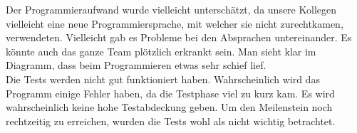 \documentclass[12pt,pdftex,a4paper]{article}
\begin{document}
\begin{itemize}
Der Programmieraufwand wurde vielleicht unterschätzt, da unsere Kollegen vielleicht eine neue Programmiersprache, mit welcher sie nicht zurechtkamen, verwendeten. Vielleicht gab es Probleme bei den Absprachen untereinander. Es könnte auch das ganze Team plötzlich erkrankt sein. Man sieht klar im Diagramm, dass beim Programmieren etwas sehr schief lief.\\

Die Tests werden nicht gut funktioniert haben. Wahrscheinlich wird das Programm einige Fehler haben, da die Testphase viel zu kurz kam. Es wird wahrscheinlich keine hohe Testabdeckung geben. Um den Meilenstein noch rechtzeitig zu erreichen, wurden die Tests wohl als nicht wichtig betrachtet.

\end{itemize}

\end{document}
